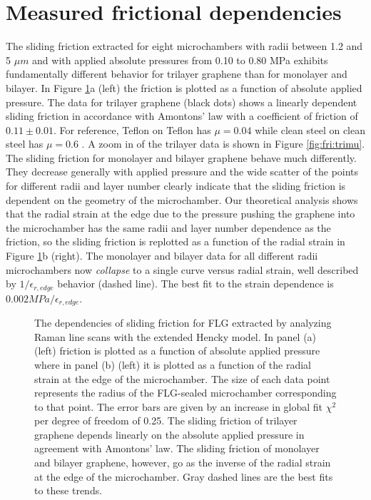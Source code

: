 \section{Measured frictional dependencies}
The sliding friction extracted for eight microchambers with radii between 1.2 and 5 $\mu m$ and with applied absolute pressures from 0.10 to 0.80 MPa exhibits fundamentally different behavior for trilayer graphene than for monolayer and bilayer.
In Figure \ref{fig:fri:FvsP}a (left) the friction is plotted as a function of absolute applied pressure.
The data for trilayer graphene (black dots) shows a linearly dependent sliding friction in accordance with Amontons' law with a coefficient of friction of $0.11 \pm 0.01$.
For reference, Teflon on Teflon has $\mu=0.04$ while clean steel on clean steel has $\mu=0.6$ \cite{Resnick2002}.
A zoom in of the trilayer data is shown in Figure \ref{fig:fri:trimu}.
The sliding friction for monolayer and bilayer graphene behave much differently.
They decrease generally with applied pressure and the wide scatter of the points for different radii and layer number clearly indicate that the sliding friction is dependent on the geometry of the microchamber.
Our theoretical analysis shows that the radial strain at the edge due to the pressure pushing the graphene into the microchamber has the same radii and layer number dependence as the friction, so the sliding friction is replotted as a function of the radial strain in Figure \ref{fig:fri:FvsP}b (right).
The monolayer and bilayer data for all different radii microchambers now \emph{collapse} to a single curve versus radial strain, well described by $1/\epsilon_{r,edge}$ behavior (dashed line).
The best fit to the strain dependence is $0.002 MPa/\epsilon_{r,edge}$.

\begin{figure}
	\begin{center}
	
	\end{center}
	\caption[The dependencies of sliding friction for FLG]{\label{fig:fri:FvsP}
	The dependencies of sliding friction for FLG extracted by analyzing Raman line scans with the extended Hencky model.
	In panel (a) (left) friction is plotted as a function of absolute applied pressure where in panel (b) (left) it is plotted as a function of the radial strain at the edge of the microchamber.
	The size of each data point represents the radius of the FLG-sealed microchamber corresponding to that point. The error bars are given by an increase in global fit $\chi^2$ per degree of freedom of 0.25.
	The sliding friction of trilayer graphene depends linearly on the absolute applied pressure in agreement with Amontons' law.
	The sliding friction of monolayer and bilayer graphene, however, go as the inverse of the radial strain at the edge of the microchamber.
	Gray dashed lines are the best fits to these trends.}
\end{figure}

